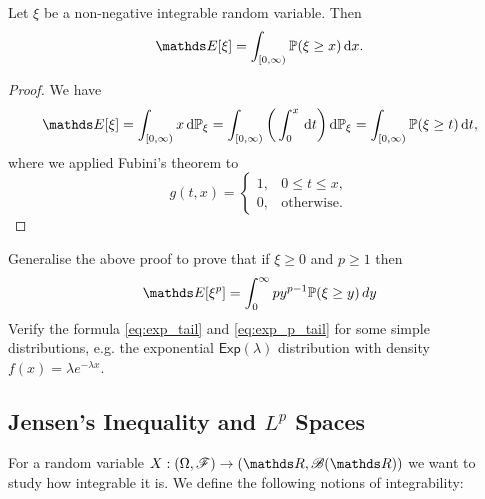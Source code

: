 \begin{proposition} \label{prop:exp_tail}
Let $\xi$ be a non-negative integrable random variable. Then
\begin{equation}
    \E[\xi] = \int_{[0,\infty)}\p(\xi \ge x) \, \d x. \label{eq:exp_tail}
\end{equation}
\end{proposition}
\begin{proof}
We have
\begin{align}
    \E[\xi] = \int_{[0, \infty)}x \, \d \p_\xi
    = \int_{[0, \infty)} \bigg( \int_0^x \, \d t \bigg) \, \d \p_\xi
    =\int_{[0, \infty)} \p(\xi \ge t) \, \d t,
\end{align}
where we applied Fubini's theorem to 
\begin{equation}
    g(t,x) = 
    \begin{cases}
     1, & 0\le t \le x,\\
     0, & \text{otherwise.}
    \end{cases}
\end{equation}
\end{proof}

\begin{exercise}
Generalise the above proof to prove that if $\xi \geq 0$ and $p \geq 1$ then
\begin{equation}
\E[\xi^p] = \int_0^\infty py^{p-1} \p(\xi\geq y) \, dy \label{eq:exp_p_tail}
\end{equation}
Verify the formula \ref{eq:exp_tail} and \ref{eq:exp_p_tail} for some simple distributions, e.g. the exponential $\mathsf{Exp}(\lambda)$ distribution with density $f(x) = \lambda e^{-\lambda x}$.
\end{exercise}

\subsection{Jensen's Inequality and $L^p$ Spaces}
For a random variable $X:(\Omega,\F) \to (\R,\B(\R))$ we want to study how integrable it is. We define the following notions of integrability:

